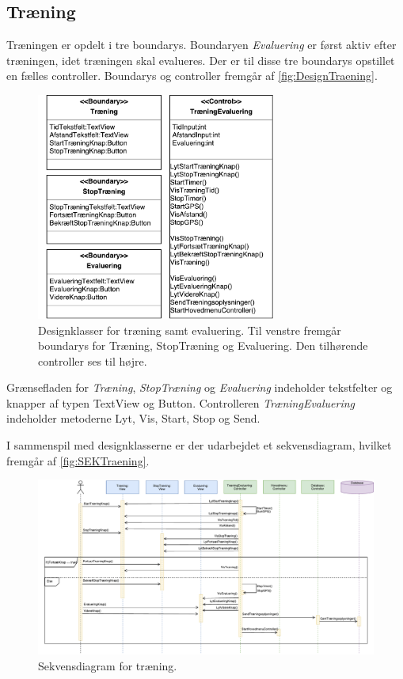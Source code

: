 \subsection*{Træning}
Træningen er opdelt i tre boundarys. Boundaryen \textit{Evaluering} er først aktiv efter træningen, idet træningen skal evalueres. Der er til disse tre boundarys opstillet en fælles controller. Boundarys og controller fremgår af \autoref{fig:DesignTraening}. 

\begin{figure} [H]
\centering
\includegraphics[width=0.7\textwidth]{figures/MVC/MVCTraening}
\caption{Designklasser for træning samt evaluering. Til venstre fremgår boundarys for Træning, StopTræning og Evaluering. Den tilhørende controller ses til højre.}
\label{fig:DesignTraening}
\end{figure}

\noindent
Grænsefladen for \textit{Træning}, \textit{StopTræning} og \textit{Evaluering} indeholder tekstfelter og knapper af typen TextView og Button. Controlleren \textit{TræningEvaluering} indeholder metoderne Lyt, Vis, Start, Stop og Send. 

I sammenspil med designklasserne er der udarbejdet et sekvensdiagram, hvilket fremgår af \autoref{fig:SEKTraening}. 

\begin{figure} [H]
\centering
\includegraphics[width=1.55\textwidth, angle=90]{figures/Sek/SEKTraening}
\caption{Sekvensdiagram for træning.}
\label{fig:SEKTraening}
\end{figure}

